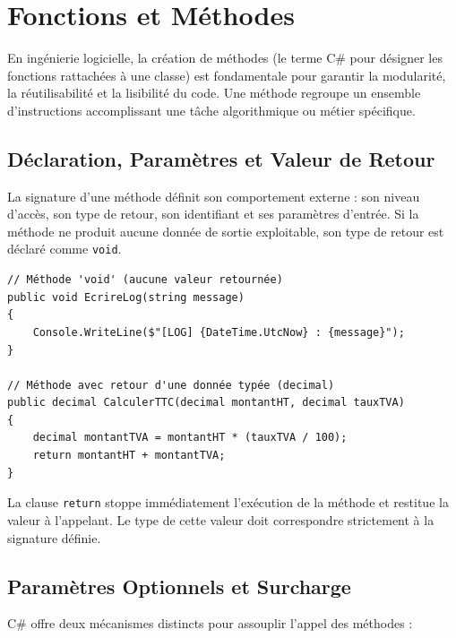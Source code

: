 
\newpage
\section{Fonctions et Méthodes}

En ingénierie logicielle, la création de méthodes (le terme C\# pour désigner les fonctions rattachées à une classe) est fondamentale pour garantir la modularité, la réutilisabilité et la lisibilité du code. Une méthode regroupe un ensemble d'instructions accomplissant une tâche algorithmique ou métier spécifique.

\subsection{Déclaration, Paramètres et Valeur de Retour}

La signature d'une méthode définit son comportement externe : son niveau d'accès, son type de retour, son identifiant et ses paramètres d'entrée. 
Si la méthode ne produit aucune donnée de sortie exploitable, son type de retour est déclaré comme \texttt{void}.

\begin{lstlisting}[style=csharpstyle]
// Méthode 'void' (aucune valeur retournée)
public void EcrireLog(string message)
{
    Console.WriteLine($"[LOG] {DateTime.UtcNow} : {message}");
}

// Méthode avec retour d'une donnée typée (decimal)
public decimal CalculerTTC(decimal montantHT, decimal tauxTVA)
{
    decimal montantTVA = montantHT * (tauxTVA / 100);
    return montantHT + montantTVA;
}
\end{lstlisting}

La clause \texttt{return} stoppe immédiatement l'exécution de la méthode et restitue la valeur à l'appelant. Le type de cette valeur doit correspondre strictement à la signature définie.

\subsection{Paramètres Optionnels et Surcharge}

C\# offre deux mécanismes distincts pour assouplir l'appel des méthodes :

